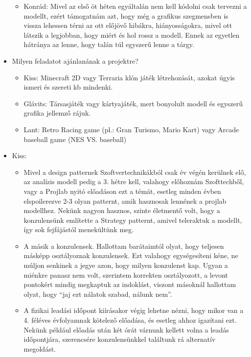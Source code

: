 \begin{itemize}
\begin{itemize}
	\item Konrád: Mivel az első öt héten egyáltalán nem kell kódolni csak tervezni a modellt, ezért támogatnám azt, hogy még a grafikus szegmensben is vissza lehessen térni az ott előjövő hibákra, hiányosságokra, mivel ott látszik a legjobban, hogy miért és hol rossz a modell. Ennek az egyetlen hátránya az lenne, hogy talán túl egyszerű lenne a tárgy.
\end{itemize}
\item Milyen feladatot ajánlanának a projektre? \newline
\begin{itemize}
	\item Kiss: Minecraft 2D vagy Terraria klón játék létrehozását, azokat úgyis ismeri és szereti kb mindenki.
	\item Glávits: Társasjáték vagy kártyajáték, mert bonyolult modell és egyszerű grafika jellemző rájuk.
	\item Lant: Retro Racing game (pl.: Gran Turismo, Mario Kart) vagy Arcade baseball game (NES VS. baseball)
\end{itemize}
\end{itemize}

\begin{itemize}
	\item Kiss: 
		\begin{itemize}
			\item Mivel a design patternek Szoftvertechnikákból csak év végén kerülnek elő, az analízis modell pedig a 3. hétre kell, valahogy előhoznám Szofttechből, vagy a Projlab nyitó előadáson ezt a témát, esetleg minden évben elspoilerezve 2-3 olyan patternt, amik hasznosak lennének a projlab modellhez. Nekünk nagyon hasznos, szinte életmentő volt, hogy a konzulensünk említette a Strategy patternt, amivel teleraktuk a modellt, így sok fejfájástól menekültünk meg.
			\item A másik a konzulensek. Hallottam barátaimtól olyat, hogy teljesen másképp osztályoznak konzulensek. Ezt valahogy egységesíteni kéne, ne múljon senkinek a jegye azon, hogy milyen konzulenst kap. Ugyan a miénkre panasz nem volt, szerintem korrekten osztályozott, a levont pontokért mindig megkaptuk az indoklást, viszont másoknál hallottam olyat, hogy ``jaj ezt nálatok szabad, nálunk nem''.
			\item A fizikai leadási időpont kiírásakor végig lehetne nézni, hogy mikor van a 4. féléves évfolyamnak kötelező előadása, és esetleg ahhoz igazítani ezt. Nekünk például előadás után két órát várnunk kellett volna a leadás időpontjára, szerencsére konzulensünkkel találtunk rá alternatív megoldást.
		\end{itemize}
\end{itemize}

